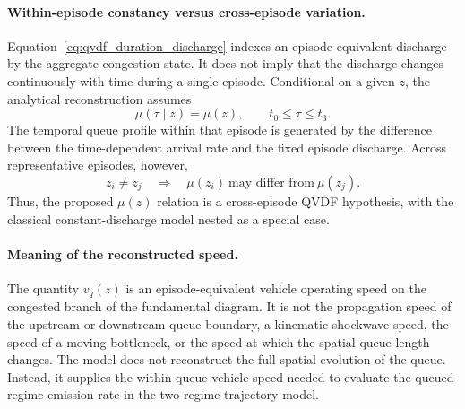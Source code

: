 
\paragraph{Within-episode constancy versus cross-episode variation.}
Equation~\eqref{eq:qvdf_duration_discharge} indexes an
episode-equivalent discharge by the aggregate congestion state. It does not
imply that the discharge changes continuously with time during a single
episode. Conditional on a given $z$, the analytical reconstruction assumes
\begin{equation}
\mu(\tau\mid z)=\mu(z),
\qquad
t_0\leq\tau\leq t_3.
\end{equation}
The temporal queue profile within that episode is generated by the difference
between the time-dependent arrival rate and the fixed episode discharge.
Across representative episodes, however,
\begin{equation}
z_i\neq z_j
\quad\Longrightarrow\quad
\mu(z_i)\ \text{may differ from}\ \mu(z_j).
\end{equation}
Thus, the proposed $\mu(z)$ relation is a cross-episode QVDF hypothesis,
with the classical constant-discharge model nested as a special case.



\paragraph{Meaning of the reconstructed speed.}
The quantity $v_q(z)$ is an episode-equivalent vehicle operating speed on the
congested branch of the fundamental diagram. It is not the propagation speed
of the upstream or downstream queue boundary, a kinematic shockwave speed,
the speed of a moving bottleneck, or the speed at which the spatial queue
length changes. The model does not reconstruct the full spatial evolution of
the queue. Instead, it supplies the within-queue vehicle speed needed to
evaluate the queued-regime emission rate in the two-regime trajectory model.



